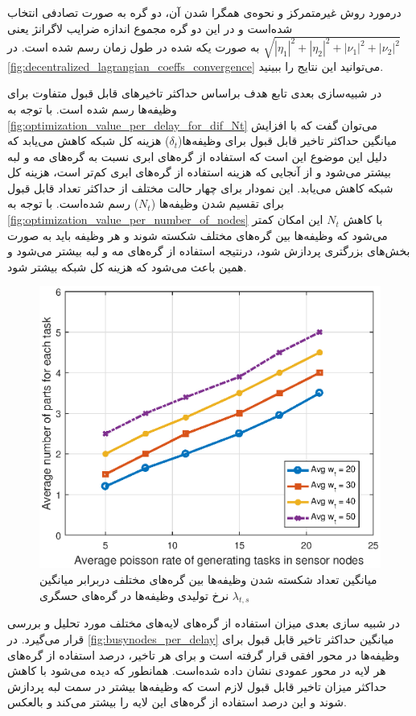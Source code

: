 	درمورد روش غیرمتمرکز و نحوه‌ی همگرا شدن آن، دو گره به صورت تصادفی انتخاب شده‌است و در این دو گره مجموع اندازه‌ ضرایب لاگرانژ یعنی $\sqrt{|\eta_1|^2+|\eta_2|^2+|\nu_1|^2+|\nu_2|^2}$ به صورت یکه شده در طول زمان رسم شده است. در \cref{fig:decentralized_lagrangian_coeffs_convergence} می‌توانید این نتایج را ببینید.	

	در شبیه‌سازی بعدی تابع هدف براساس حداکثر تاخیرهای قابل قبول متفاوت برای وظیفه‌ها رسم شده است. با توجه به \cref{fig:optimization_value_per_delay_for_dif_Nt} می‌توان گفت که با افزایش میانگین حداکثر تاخیر قابل قبول برای وظیفه‌ها($\delta_t$) هزینه کل شبکه کاهش می‌یابد که دلیل این موضوع این است که استفاده از گره‌های ابری نسبت به گره‌های مه و لبه بیشتر می‌شود و از آنجایی که هزینه استفاده از گره‌های ابری کم‌تر است، هزینه کل شبکه کاهش می‌یابد. این نمودار برای چهار حالت مختلف از حداکثر تعداد قابل قبول برای تقسیم شدن وظیفه‌ها ($N_t$) رسم شده‌است. با توجه به \cref{fig:optimization_value_per_number_of_nodes} با کاهش $N_t$ این امکان کمتر می‌شود که وظیفه‌ها بین گره‌های مختلف شکسته شوند و هر وظیفه باید به صورت بخش‌های بزرگتری پردازش شود، درنتیجه استفاده از گره‌های مه و لبه بیشتر می‌شود و همین باعث می‌شود که هزینه کل شبکه بیشتر شود. 

\begin{figure}[h!]
	\centerline{\includegraphics[width=12cm]{graphics/3-cent-decent/number_of_parts_per_task_generating_rate}}
	\caption{میانگین تعداد شکسته شدن وظیفه‌ها بین گره‌های مختلف دربرابر میانگین نرخ تولیدی وظیفه‌ها در گره‌های حسگری $\lambda_{t,s}$}
	\label{fig:number_of_parts_per_task_generating_rate}
\end{figure}

	در شبیه سازی بعدی میزان استفاده از گره‌های لایه‌های مختلف مورد تحلیل و بررسی قرار می‌گیرد. در \cref{fig:busynodes_per_delay} میانگین حداکثر تاخیر قابل قبول برای وظیفه‌ها در محور افقی قرار گرفته است و برای هر تاخیر، درصد استفاده از گره‌های هر لایه در محور عمودی نشان داده شده‌است. همانطور که دیده می‌شود با کاهش حداکثر میزان تاخیر قابل قبول لازم است که وظیفه‌ها بیشتر در سمت لبه پردازش شوند و این درصد استفاده از گره‌های این لایه را بیشتر می‌کند و بالعکس. 

